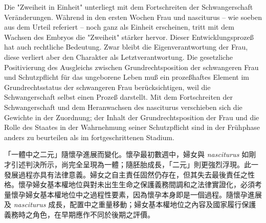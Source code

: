 \documentclass[12pt]{article}
\begin{document}
\begin{sourcepara}[title={原文SondervotumMS.277}]
Die "Zweiheit in Einheit" unterliegt mit dem Fortschreiten der Schwangerschaft Veränderungen. Während in den ersten Wochen Frau und nasciturus -- wie soeben aus dem Urteil referiert -- noch ganz als Einheit erscheinen, tritt mit dem Wachsen des Embryos die "Zweiheit" stärker hervor. Dieser Entwicklungsprozeß hat auch rechtliche Bedeutung. Zwar bleibt die Eigenverantwortung der Frau, diese verliert aber den Charakter als Letztverantwortung. Die gesetzliche Positivierung des Ausgleichs zwischen Grundrechtsposition der schwangeren Frau und Schutzpflicht für das ungeborene Leben muß ein prozeßhaftes Element im Grundrechtsstatus der schwangeren Frau berücksichtigen, weil die Schwangerschaft selbst einen Prozeß darstellt. Mit dem Fortschreiten der Schwangerschaft und dem Heranwachsen des nasciturus verschieben sich die Gewichte in der Zuordnung; der Inhalt der Grundrechtsposition der Frau und die Rolle des Staates in der Wahrnehmung seiner Schutzpflicht sind in der Frühphase anders zu beurteilen als im fortgeschrittenen Stadium.
\end{sourcepara}
\begin{transpara}
「一體中之二元」隨懷孕進展而變化。懷孕最初數週中，婦女與 \textit{nasciturus} 如剛才引述判決所示，尚完全呈現為一體；隨胚胎成長，「二元」則更強烈浮現。此一發展過程亦具有法律意義。婦女之自主責任固然仍存在，但其失去最後責任之性格。懷孕婦女基本權地位與對未出生生命之保護義務間調和之法律實證化，必須考量懷孕婦女基本權地位中之過程性要素，因為懷孕本身即是一個過程。隨懷孕進展及 \textit{nasciturus} 成長，配置中之重量移動；婦女基本權地位之內容及國家履行保護義務時之角色，在早期應作不同於後期之評價。
\end{transpara}
\end{document}
